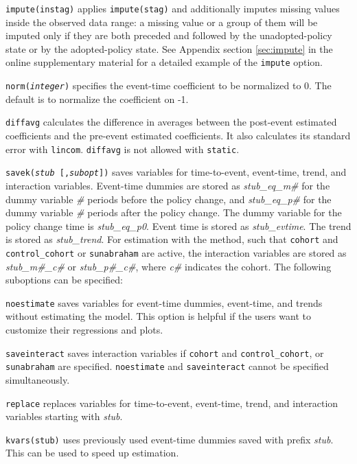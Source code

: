 \documentclass[12pt]{article}
\begin{document}
\morehangpara
{\tt impute(instag)} applies {\tt impute(stag)} and additionally imputes missing values inside the observed data range: a missing value or a group of them will be imputed only if they are both preceded and followed by the unadopted-policy state or by the adopted-policy state.
See Appendix section \ref{sec:impute} in the online supplementary material for a detailed example of the {\tt impute} option.

\hangpara
{\tt norm({\it integer})} specifies the event-time coefficient to be normalized to 0. The default is to normalize the coefficient on -1.

\hangpara
{\tt diffavg} calculates the difference in averages between the post-event estimated coefficients and the pre-event estimated coefficients.
It also calculates its standard error with {\tt lincom}.
{\tt diffavg} is not allowed with {\tt static}.

\hangpara
{\tt savek({\it stub} [,{\it subopt}])} saves variables for time-to-event, event-time, trend, and interaction variables.
Event-time dummies are stored as {\it stub\_eq\_m\#} for the dummy variable {\it \#} periods before the policy change, and {\it stub\_eq\_p\#} for the dummy variable {\it \#} periods after the policy change.
The dummy variable for the policy change time is {\it stub\_eq\_p0}.
Event time is stored as {\it stub\_evtime}. The trend is stored as {\it stub\_trend}.
For estimation with the \citet{sun2021estimating} method, such that {\tt cohort} and {\tt control\_cohort} or {\tt sunabraham} are active, the interaction variables are stored as {\it stub\_m\#\_c\#} or {\it stub\_p\#\_c\#}, where {\it c\#} indicates the cohort.
The following suboptions can be specified:

\morehangpara
{\tt noestimate} saves variables for event-time dummies, event-time, and trends without estimating the model.
This option is helpful if the users want to customize their regressions and plots.

\morehangpara
{\tt saveinteract} saves interaction variables if {\tt cohort} and {\tt control\_cohort}, or {\tt sunabraham} are specified. {\tt noestimate} and {\tt saveinteract} cannot be specified simultaneously.

\morehangpara
{\tt replace} replaces variables for time-to-event, event-time, trend, and interaction variables starting with \textit{stub}.

\hangpara
{\tt kvars(stub)} uses previously used event-time dummies saved with prefix \textit{stub}. This can be used to speed up estimation.
\end{document}
